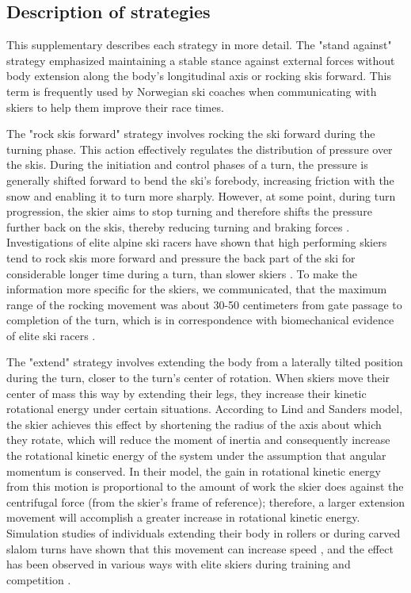 \documentclass[pdflatex,sn-nature]{sn-jnl}%
\theoremstyle{thmstyleone}%
\theoremstyle{thmstyletwo}%
\theoremstyle{thmstylethree}%
\begin{document}
\begin{appendices}

\section{Description of strategies}\label{sup_strategies}
This supplementary describes each strategy in more detail. The "stand against" strategy emphasized maintaining a stable stance against external forces without body extension along the body's longitudinal axis or rocking skis forward. This term is frequently used by Norwegian ski coaches when communicating with skiers to help them improve their race times. 

The "rock skis forward" strategy involves rocking the ski forward during the turning phase. This action effectively regulates the distribution of pressure over the skis. During the initiation and control phases of a turn, the pressure is generally shifted forward to bend the ski's forebody, increasing friction with the snow and enabling it to turn more sharply. However, at some point, during turn progression, the skier aims to stop turning and therefore shifts the pressure further back on the skis, thereby reducing turning and braking forces \cite{lemaster_skiers_1999, lemaster_ultimate_2010}. Investigations of elite alpine ski racers have shown that high performing skiers tend to rock skis more forward and pressure the back part of the ski for considerable longer time during a turn, than slower skiers \cite{reid_kinematic_2010}. To make the information more specific for the skiers, we communicated, that the maximum range of the rocking movement was about 30-50 centimeters from gate passage to completion of the turn, which is in correspondence with biomechanical evidence of elite ski racers \cite{reid_kinematic_2010}. 

The "extend" strategy involves extending the body from a laterally tilted position during the turn, closer to the turn's center of rotation. When skiers move their center of mass this way by extending their legs, they increase their kinetic rotational energy under certain situations. According to Lind and Sanders \cite{lind_physics_2004} model, the skier achieves this effect by shortening the radius of the axis about which they rotate, which will reduce the moment of inertia and consequently increase the rotational kinetic energy of the system under the assumption that angular momentum is conserved. In their model, the gain in rotational kinetic energy from this motion is proportional to the amount of work the skier does against the centrifugal force (from the skier's frame of reference); therefore, a larger extension movement will accomplish a greater increase in rotational kinetic energy. Simulation studies of individuals extending their body in rollers or during carved slalom turns have shown that this movement can increase speed \cite{mote_accelerations_1983,luginbuhl_identification_2023}, and the effect has been observed in various ways with elite skiers during training and competition \cite{reid_kinematic_2010, magelssen_is_2022, supej_differential_2008}. 


\end{appendices}
\end{document}
